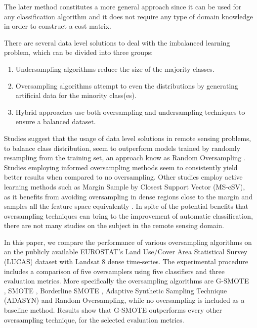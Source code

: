 \documentclass[parskip=full]{scrartcl}
\begin{document}
The later method constitutes a more general approach since it can be used for
any classification algorithm and it does not require any type of domain
knowledge in order to construct a cost matrix.

There are several data level solutions to deal with the imbalanced learning
problem, which can be divided into three groups:

\begin{enumerate}

	\item Undersampling algorithms reduce the size of the majority classes.
	
	\item Oversampling algorithms attempt to even the distributions by
	generating artificial data for the minority class(es).

	\item Hybrid approaches use both oversampling and undersampling techniques
	to ensure a balanced dataset.

\end{enumerate}

Studies suggest that the usage of data level solutions in remote sensing
problems, to balance class distribution, seem to outperform models trained by
randomly resampling from the training set, an approach know as Random
Oversampling \cite{Wang2019, Mellor2015}.  Studies employing informed
oversampling methods seem to consistently yield better results
\cite{Johnson2013, Geib2015} when compared to no oversampling. Other studies
employ active learning methods such as Margin Sample by Closest Support Vector
(MS-cSV), as it benefits from avoiding oversampling in dense regions close to
the margin and samples all the feature space equivalently \cite{Tuia2009}. In
spite of the potential benefits that oversampling techniques can bring to the
improvement of automatic classification, there are not many studies on the
subject in the remote sensing domain.

In this paper, we compare the performance of various oversampling algorithms on
an the publicly available EUROSTAT's Land Use/Cover Area Statistical Survey
(LUCAS) dataset \cite{LUCAS2015} with Landsat 8 dense time-series. The
experimental procedure includes a comparison of five oversamplers using five
classifiers and three evaluation metrics. More specifically the oversampling
algorithms are G-SMOTE \cite{Douzas2019}, SMOTE \cite{Chawla2002}, Borderline
SMOTE \cite{Han2005}, Adaptive Synthetic Sampling Technique (ADASYN)
\cite{HaiboHe2008} and Random Oversampling, while no oversampling is included as
a baseline method. Results show that G-SMOTE outperforms every other
oversampling technique, for the selected evaluation metrics.
\end{document}
